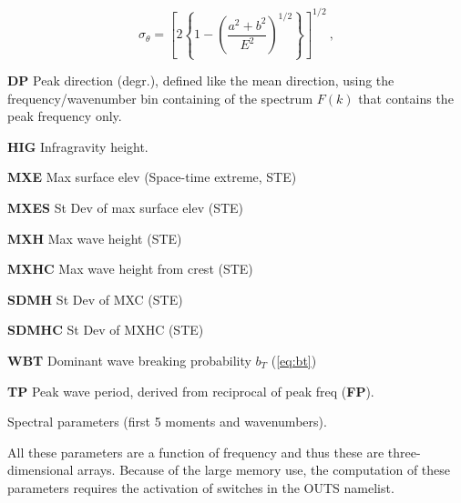 \begin{list}{)\hfill}
\begin{list}{)\hfill}
      \begin{equation} \sigma_\theta = \left [ 2 \left \{ 1 - \left (
      \frac{a^2+b^2}{E^2} \right )^{1/2} \right \} \right ]^{1/2}
      \: , \label{eq:sig_th} \end{equation}
\item \textbf{DP} Peak direction (degr.), defined like the mean direction, using the
      frequency/wavenumber bin containing of the spectrum $F(k)$ that
      contains the peak frequency only.
\item \textbf{HIG} Infragravity height.
\item \textbf{MXE}   Max surface elev (Space-time extreme, STE)
\item \textbf{MXES}  St Dev of max surface elev (STE)
\item \textbf{MXH}  Max wave height (STE)
\item \textbf{MXHC}  Max wave height from crest (STE)
\item \textbf{SDMH}  St Dev of MXC (STE)
\item \textbf{SDMHC} St Dev of MXHC (STE)
\item \textbf{WBT}   Dominant wave breaking probability $b_T$ (\ref{eq:bt})
\item \textbf{TP} Peak wave period, derived from reciprocal of peak freq
(\textbf{FP}).
\end{list}

\item{Spectral parameters (first 5 moments and wavenumbers). 

All these parameters are a function 
of frequency and thus these are three-dimensional arrays. Because of the large memory use, the 
computation of these parameters requires the activation of switches in the {\F OUTS} namelist.}

\begin{list}{)\hfill}
            { \leftmargin 8mm 
             \rightmargin 0mm \itemsep 0mm \parsep 0mm}
   

\end{list}
\end{list}
